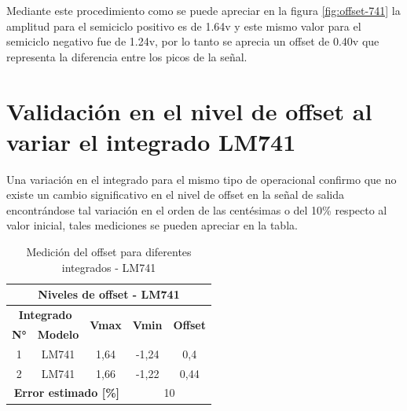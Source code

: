 Mediante este procedimiento como se puede apreciar en la figura \ref{fig:offset-741} la amplitud para el semiciclo positivo es de 1.64v y este mismo valor para el semiciclo negativo fue de 1.24v, por lo tanto se aprecia un offset de 0.40v que representa la diferencia entre los picos de la señal.

\section{Validación en el nivel de offset al variar el integrado LM741}

Una variación en el integrado para el mismo tipo de operacional confirmo que no existe un cambio significativo en el nivel de offset en la señal de salida encontrándose tal variación en el orden de las centésimas o del 10\% respecto al valor inicial, tales mediciones se pueden apreciar en la tabla.

\begin{table}[]
	\centering
	\begin{tabular}{|ccccc|}
		\hline
		\multicolumn{5}{|c|}{\textbf{Niveles de offset - LM741}}                                                                                                                                                                \\ \hline
		\multicolumn{2}{|c|}{\textbf{Integrado}}                                 & \multicolumn{1}{c|}{\multirow{2}{*}{\textbf{Vmax}}} & \multicolumn{1}{c|}{\multirow{2}{*}{\textbf{Vmin}}} & \multirow{2}{*}{\textbf{Offset}} \\ \cline{1-2}
		\multicolumn{1}{|c|}{\textbf{N°}} & \multicolumn{1}{c|}{\textbf{Modelo}} & \multicolumn{1}{c|}{}                               & \multicolumn{1}{c|}{}                               &                                  \\ \hline
		\multicolumn{1}{|c|}{1}           & \multicolumn{1}{c|}{LM741}           & \multicolumn{1}{c|}{1,64}                           & \multicolumn{1}{c|}{-1,24}                          & 0,4                              \\ \hline
		\multicolumn{1}{|c|}{2}           & \multicolumn{1}{c|}{LM741}           & \multicolumn{1}{c|}{1,66}                           & \multicolumn{1}{c|}{-1,22}                          & 0,44                             \\ \hline
		\multicolumn{3}{|c|}{\textbf{Error estimado {[}\%{]}}}                                                                         & \multicolumn{2}{c|}{10}                                                                \\ \hline
	\end{tabular}
	\caption{Medición del offset para diferentes integrados - LM741}
	\label{tab:comparacion-offset-lm741}
\end{table}

